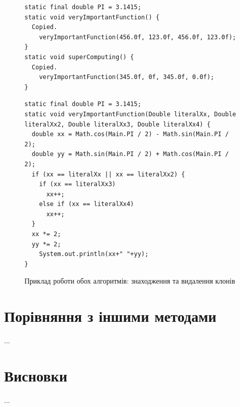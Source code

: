 \documentclass[a4paper, 14pt]{article}
\begin{document}
\begin{figure}[h!]
\centering
\begin{minipage}{.4\textwidth}
\begin{lstlisting}[frame=none]
static final double PI = 3.1415;
static void veryImportantFunction() {
  Copied.
    veryImportantFunction(456.0f, 123.0f, 456.0f, 123.0f);
}
static void superComputing() {
  Copied.
    veryImportantFunction(345.0f, 0f, 345.0f, 0.0f);
}
\end{lstlisting}
\end{minipage}
\begin{minipage}{.55\textwidth}
\begin{lstlisting}[frame=none]
static final double PI = 3.1415;
static void veryImportantFunction(Double literalXx, Double literalXx2, Double literalXx3, Double literalXx4) {
  double xx = Math.cos(Main.PI / 2) - Math.sin(Main.PI / 2);
  double yy = Math.sin(Main.PI / 2) + Math.cos(Main.PI / 2);
  if (xx == literalXx || xx == literalXx2) {
    if (xx == literalXx3)
      xx++;
    else if (xx == literalXx4)
      xx++;
  }
  xx *= 2;
  yy *= 2;
	System.out.println(xx+" "+yy);
}
\end{lstlisting}
\end{minipage}
\caption*{Приклад роботи обох алгоритмів: знаходження та видалення клонів}
\end{figure}
\section{Порівняння з іншими методами}
...
\section{Висновки}
...
\printbibliography[title={список використаних джерел}]
\end{document}
